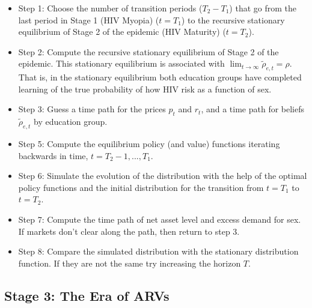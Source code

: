 \begin{itemize}
\item Step 1: Choose the number of transition periods ($T_2-T_1$) that go from the last  period in Stage 1 (HIV Myopia) ($t=T_1$) to the recursive stationary equilibrium of Stage 2 of the epidemic (HIV Maturity) ($t=T_2$).
\item Step 2: Compute the recursive stationary equilibrium of Stage 2 of the epidemic. This stationary equilibrium is associated with $\lim_{t \rightarrow \infty }\widetilde{\rho}_{e,t}=\rho$. That is, in the stationary equilibrium both education groups have completed learning of the true probability of how HIV risk as a function of sex.
\item Step 3: Guess a time path for the prices $p_{t}$ and $r_{t}$, and a time path for beliefs $\widetilde{\rho}_{e,t}$ by education group.
\item Step 5: Compute the equilibrium policy (and value) functions iterating backwards in time, $t = T_2-1,...,T_1$.
\item Step 6: Simulate the evolution of the distribution with the help of the optimal policy functions and the initial distribution for the transition from $t = T_1$ to $t = T_2$.
\item Step 7: Compute the time path of net asset level and excess demand for sex. If markets don't clear along the path, then return to step 3.
\item Step 8: Compare the simulated distribution  with the stationary distribution function. If they are not the same try increasing the horizon $T$.
\end{itemize}

\clearpage
\subsection*{\sf Stage 3: The Era of ARVs}



\clearpage
